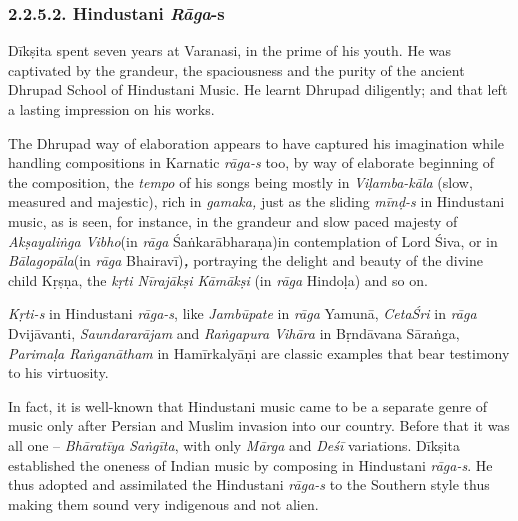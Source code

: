 \vspace{-.2cm}

\subsubsection*{2.2.5.2. Hindustani \textit{Rāga}-s}

\vspace{-.2cm}

Dīkṣita spent seven years at Varanasi, in the prime of his youth. He was captivated by the grandeur, the spaciousness and the purity of the ancient Dhrupad School of Hindustani Music. He learnt Dhrupad diligently; and that left a lasting impression on his works.

The Dhrupad way of elaboration appears to have captured his imagination while handling compositions in Karnatic \textit{rāga-s} too, by way of elaborate beginning of the composition, the \textit{tempo} of his songs being mostly in \textit{Viḷamba-kāla} (slow, measured and majestic), rich in \textit{gamaka,} just as the sliding \textit{mīnḍ-s} in Hindustani music, as is seen, for instance, in the grandeur and slow paced majesty of \textit{Akṣayaliṅga Vibho}(in \textit{rāga} Śaṅkarābharaṇa)in contemplation of Lord Śiva, or in \textit{Bālagopāla}(in \textit{rāga} Bhairavī)\textit{\textbf{, }}portraying the delight and beauty of the divine child Kṛṣṇa, the \textit{kṛti Nīrajākṣi Kāmākṣi} (in \textit{rāga} Hindoḷa) and so on.

\newpage

\textit{Kṛti-s} in Hindustani \textit{rāga-s}, like \textit{Jambūpate} in \textit{rāga} Yamunā, \textit{CetaŚri} in \textit{rāga} Dvijāvanti, \textit{Saundararājam} and \textit{Raṅgapura Vihāra} in Bṛndāvana Sāraṅga, \textit{Parimaḷa Raṅganātham} in Hamīrkalyāṇi are classic examples that bear testimony to his virtuosity.

In fact, it is well-known that Hindustani music came to be a separate genre of music only after Persian and Muslim invasion into our country. Before that it was all one – \textit{Bhāratīya Saṅgīta}, with only \textit{Mārga} and \textit{Deśī} variations. Dīkṣita established the oneness of Indian music by composing in Hindustani \textit{rāga-s}. He thus adopted and assimilated the Hindustani \textit{rāga-s} to the Southern style thus making them sound very indigenous and not alien.

